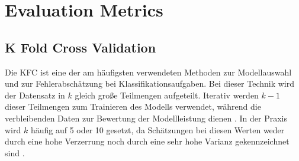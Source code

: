 
\section{Evaluation Metrics}
\subsection{K Fold Cross Validation}

Die \acrfull{KFC} ist eine der am häufigsten verwendeten Methoden zur Modellauswahl und zur Fehlerabschätzung bei Klassifikationsaufgaben. Bei dieser Technik wird der Datensatz in $k$ gleich große Teilmengen aufgeteilt. Iterativ werden $k-1$ dieser Teilmengen zum Trainieren des Modells verwendet, während die verbleibenden Daten zur Bewertung der Modellleistung dienen \cite{Anguita2012}. In der Praxis wird $k$ häufig auf 5 oder 10 gesetzt, da Schätzungen bei diesen Werten weder durch eine hohe Verzerrung noch durch eine sehr hohe Varianz gekennzeichnet sind \cite{Nti2021}. 

